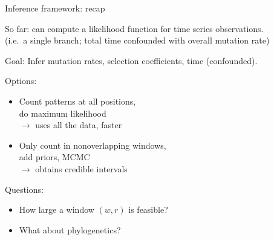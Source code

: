 \documentclass[smaller]{beamer}
\begin{document}
\begin{frame}{Inference framework: recap}

  {\struct So far:} 
  can compute a likelihood function for time series observations. \\
  (i.e.\ a single branch; total time confounded with overall mutation rate)

  \vspace{1em}

  {\struct Goal:} 
  Infer mutation rates, selection coefficients, time (confounded).

  \vspace{1em}

  {\struct Options:} \\
  \begin{itemize}

    \item Count patterns at all positions, \\
      do maximum likelihood \\
      $\longrightarrow$ uses all the data, faster

    \item Only count in nonoverlapping windows, \\
      add priors, MCMC \\
      $\longrightarrow$ obtains credible intervals

  \end{itemize}

  {\struct Questions:} \\
  \begin{itemize}

    \item How large a window $(w,r)$ is feasible?

    \item What about phylogenetics?

  \end{itemize}
  

\end{frame}
\end{document}
